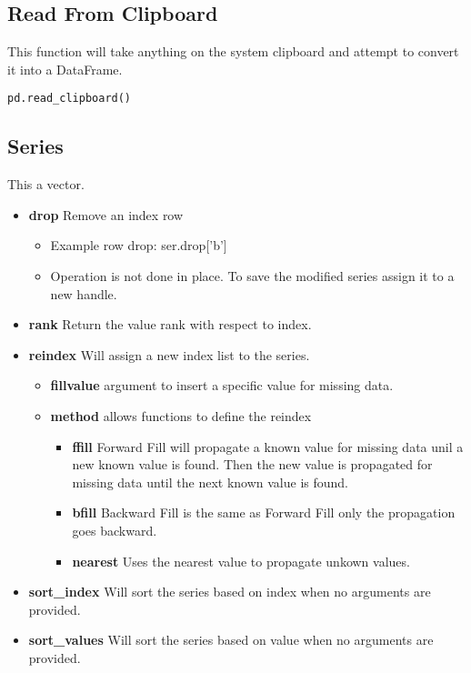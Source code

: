 \subsection{Read From Clipboard}
This function will take anything on the system clipboard and attempt to convert
it into a DataFrame.
\begin{lstlisting}
pd.read_clipboard()
\end{lstlisting}

\subsection{Series}
This a vector.
\begin{itemize}
  \item \textbf{drop} Remove an index row
    \begin{itemize}
      \item Example row drop: ser.drop['b']
      \item Operation is not done in place.  To save the modified series
        assign it to a new handle.
    \end{itemize}
  \item \textbf{rank} Return the value rank with respect to index.
  \item \textbf{reindex} Will assign a new index list to the series.
    \begin{itemize}
      \item \textbf{fill\textunderscore value} argument to insert a specific
        value for missing data.
      \item \textbf{method} allows functions to define the reindex
        \begin{itemize}
          \item \textbf{ffill} Forward Fill will propagate a known value for
            missing data unil a new known value is found.  Then the new value
            is propagated for missing data until the next known value is found.
          \item \textbf{bfill} Backward Fill is the same as Forward Fill only
            the propagation goes backward.
          \item \textbf{nearest} Uses the nearest value to propagate unkown
            values.
        \end{itemize}
    \end{itemize}
  \item \textbf{sort\_index} Will sort the series based on index when no
    arguments are provided.
  \item \textbf{sort\_values} Will sort the series based on value when no
    arguments are provided.
\end{itemize}
